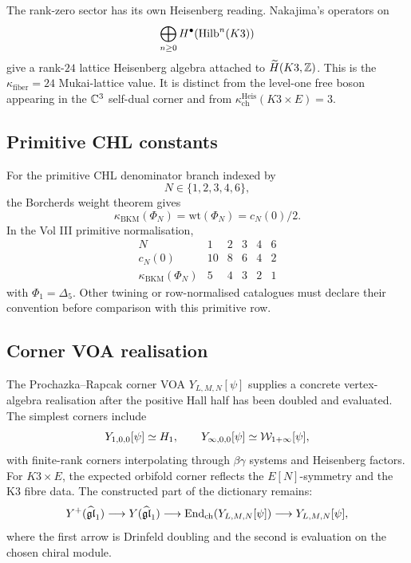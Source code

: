 The rank-zero sector has its own Heisenberg reading.  Nakajima's
operators on
\[
 \bigoplus_{n\geq 0}H^\bullet(\mathrm{Hilb}^n(K3))
\]
give a rank-\(24\) lattice Heisenberg algebra attached to
\(\widetilde H(K3,\mathbb{Z})\).  This is the \(\kappa_{\mathrm{fiber}}=24\)
Mukai-lattice value.  It is distinct from the level-one free boson
appearing in the \(\mathbb{C}^3\) self-dual corner and from
\(\kappa_{\mathrm{ch}}^{\mathrm{Heis}}(K3\times E)=3\).

\subsection{Primitive CHL constants}
\label{wn:subsec:primitive-chl-constants}

For the primitive CHL denominator branch indexed by
\[
 N\in\{1,2,3,4,6\},
\]
the Borcherds weight theorem gives
\[
 \kappa_{\mathrm{BKM}}(\Phi_N)=\mathrm{wt}(\Phi_N)=c_N(0)/2.
\]
In the Vol III primitive normalisation,
\[
\begin{array}{c|ccccc}
N & 1 & 2 & 3 & 4 & 6 \\
\hline
c_N(0) & 10 & 8 & 6 & 4 & 2 \\
\kappa_{\mathrm{BKM}}(\Phi_N) & 5 & 4 & 3 & 2 & 1
\end{array}
\]
with \(\Phi_1=\Delta_5\).  Other twining or row-normalised catalogues
must declare their convention before comparison with this primitive row.

\subsection{Corner VOA realisation}
\label{wn:subsec:corner-voa-realisation}

The Prochazka--Rapcak corner VOA \(Y_{L,M,N}[\psi]\) supplies a concrete
vertex-algebra realisation after the positive Hall half has been doubled
and evaluated.  The simplest corners include
\[
 Y_{1,0,0}[\psi]\simeq H_1,\qquad
 Y_{\infty,0,0}[\psi]\simeq \mathcal{W}_{1+\infty}[\psi],
\]
with finite-rank corners interpolating through \(\beta\gamma\) systems
and Heisenberg factors.  For \(K3\times E\), the expected orbifold
corner reflects the \(E[N]\)-symmetry and the K3 fibre data.  The
constructed part of the dictionary remains:
\[
Y^+(\widehat{\mathfrak{gl}}_1)
\longrightarrow
Y(\widehat{\mathfrak{gl}}_1)
\longrightarrow
\mathrm{End}_{\mathrm{ch}}(Y_{L,M,N}[\psi])
\longrightarrow
Y_{L,M,N}[\psi],
\]
where the first arrow is Drinfeld doubling and the second is evaluation
on the chosen chiral module.

